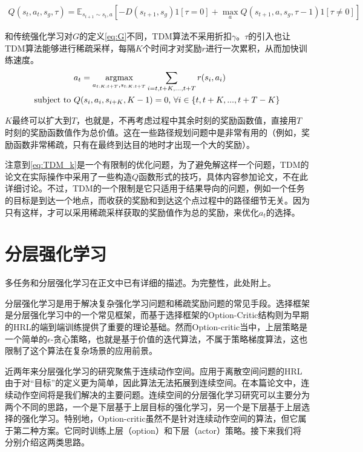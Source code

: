     \begin{align}
      Q(s_t, a_t, s_g, \tau) = \mathbb{E}_{s_{t+1} \sim s_t, a}[-D(s_{t+1}, s_g)1[\tau = 0] + \max_a Q(s_{t+1}, a, s_g, \tau - 1)1[\tau \neq 0]]
    \end{align}
    \par 和传统强化学习对$G$的定义\eqref{eq:G}不同，TDM算法不采用折扣$\gamma$。$\tau$的引入也让TDM算法能够进行稀疏采样，每隔$K$个时间才对奖励$r$进行一次累积，从而加快训练速度。
    \begin{align}
    \begin{aligned}
      & a_t = \operatorname*{argmax}_{a_{t:K:t+T}, s_{t:K:t+T}} \sum_{i = t, t+K, ..., t+T} r(s_i, a_i)\\
      \text{subject to } &Q(s_i, a_i, s_{i+K}, K-1) = 0 \text{,   } \forall i \in \{t, t+K, ..., t+T-K\} 
      \label{eq:TDM_k}
    \end{aligned}
    \end{align}
    \par $K$最终可以扩大到$T$，也就是，不再考虑过程中其余时刻的奖励函数值，直接用$T$时刻的奖励函数值作为总价值。这在一些路径规划问题中是非常有用的（例如，奖励函数非常稀疏，只有在最终到达目的地时才出现一个大的奖励）。
    \par 注意到\eqref{eq:TDM_k}是一个有限制的优化问题，为了避免解这样一个问题，TDM的论文在实际操作中采用了一些构造$Q$函数形式的技巧，具体内容参加论文\cite{TDM}，不在此详细讨论。不过，TDM的一个限制是它只适用于结果导向的问题，例如一个任务的目标是到达一个地点，而收获的奖励和到达这个点过程中的路径细节无关。因为只有这样，才可以采用稀疏采样获取的奖励值作为总的奖励，来优化$a_t$的选择。
  
  \section{分层强化学习}
    多任务和分层强化学习在正文中已有详细的描述。为完整性，此处附上。

分层强化学习是用于解决复杂强化学习问题和稀疏奖励问题的常见手段\cite{Sutton:1999}\cite{HRL_with_maxQ}\cite{FUN}\cite{Barto_HRL}。选择框架\cite{Sutton:1998_options}\cite{Sutton:1999}是分层强化学习中的一个常见框架，而基于选择框架的Option-Critic结构\cite{option-critic}则为早期的HRL的端到端训练提供了重要的理论基础。然而Option-critic当中，上层策略是一个简单的$\epsilon$-贪心策略，也就是基于价值的迭代算法，不属于策略梯度算法，这也限制了这个算法在复杂场景的应用前景。

近两年来分层强化学习的研究聚焦于连续动作空间。应用于离散空间问题的HRL由于对``目标''的定义更为简单，因此算法无法拓展到连续空间。在本篇论文中，连续动作空间将是我们解决的主要问题。连续空间的分层强化学习研究可以主要分为两个不同的思路，一个是下层基于上层目标的强化学习，另一个是下层基于上层选择的强化学习。特别地，Option-critic虽然不是针对连续动作空间的算法，但它属于第二种方案。它同时训练上层（option）和下层（actor）策略。接下来我们将分别介绍这两类思路。


